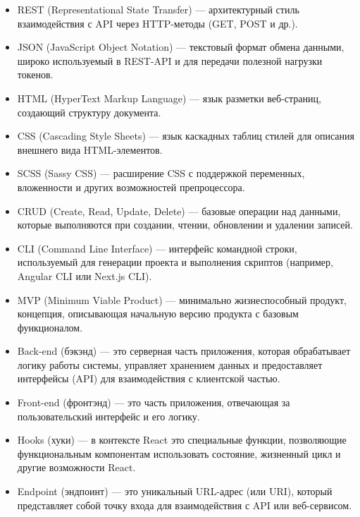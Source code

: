 \begin{itemize}
  \item REST (Representational State Transfer) — архитектурный стиль взаимодействия с API через HTTP-методы (GET, POST и др.).
  \item JSON (JavaScript Object Notation) — текстовый формат обмена данными, широко используемый в REST-API и для передачи полезной нагрузки токенов.
  \item HTML (HyperText Markup Language) — язык разметки веб-страниц, создающий структуру документа.
  \item CSS (Cascading Style Sheets) — язык каскадных таблиц стилей для описания внешнего вида HTML-элементов.
  \item SCSS (Sassy CSS) — расширение CSS с поддержкой переменных, вложенности и других возможностей препроцессора.
  \item CRUD (Create, Read, Update, Delete) — базовые операции над данными, которые выполняются при создании, чтении, обновлении и удалении записей.
  \item CLI (Command Line Interface) — интерфейс командной строки, используемый для генерации проекта и выполнения скриптов (например, Angular CLI или Next.js CLI).
  \item MVP (Minimum Viable Product) — минимально жизнеспособный продукт, концепция, описывающая начальную версию продукта с базовым функционалом.
  \item Back-end (бэкэнд) — это серверная часть приложения, которая обрабатывает логику работы системы, управляет хранением данных и предоставляет интерфейсы (API) для взаимодействия с клиентской частью.
  \item Front-end (фронтэнд) — это часть приложения, отвечающая за пользовательский интерфейс и его логику.
  \item Hooks (хуки) — в контексте React это специальные функции, позволяющие функциональным компонентам использовать состояние, жизненный цикл и другие возможности React.
  \item Endpoint (эндпоинт) — это уникальный URL-адрес (или URI), который представляет собой точку входа для взаимодействия с API или веб-сервисом.
\end{itemize}